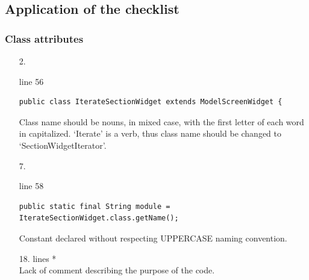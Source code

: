 \documentclass[english]{article}
\begin{document}
	\subsection{Application of the checklist}
	
\subsubsection*{Class attributes }	
\begin{itemize}

\item[2.]{line 56
		\begin{lstlisting} 
public class IterateSectionWidget extends ModelScreenWidget {
		\end{lstlisting}
		Class name should be nouns, in mixed case, with the first letter of each word
in capitalized. `Iterate' is a verb, thus class name should be changed to `SectionWidgetIterator'.}

\item[7.]{line 58
		\begin{lstlisting} 
public static final String module = IterateSectionWidget.class.getName();
		\end{lstlisting}
		Constant declared without respecting UPPERCASE naming convention.}

		\item[18.]{lines  *\\
		Lack of comment describing the purpose of the code.}
\end{itemize}
\end{document}
